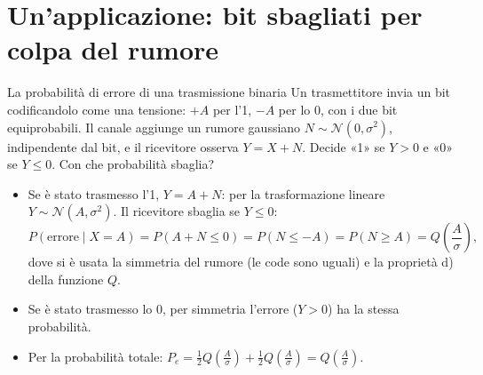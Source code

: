 \section{Un'applicazione: bit sbagliati per colpa del rumore}

\begin{esempio}{La probabilità di errore di una trasmissione binaria}
Un trasmettitore invia un bit codificandolo come una tensione: $+A$ per l'1, $-A$ per lo 0, con i due bit
equiprobabili. Il canale aggiunge un rumore gaussiano $N \sim \mathcal{N}(0, \sigma^2)$, indipendente dal bit, e il
ricevitore osserva $Y = X + N$. Decide «1» se $Y > 0$ e «0» se $Y \leq 0$. Con che probabilità sbaglia?
\begin{itemize}
  \item Se è stato trasmesso l'1, $Y = A + N$: per la trasformazione lineare $Y \sim \mathcal{N}(A, \sigma^2)$. Il
        ricevitore sbaglia se $Y \leq 0$:
        \[ P(\text{errore} \mid X = A) = P(A + N \leq 0) = P(N \leq -A) = P(N \geq A) = Q\left( \frac{A}{\sigma} \right) , \]
        dove si è usata la simmetria del rumore (le code sono uguali) e la proprietà d) della funzione $Q$.
  \item Se è stato trasmesso lo 0, per simmetria l'errore ($Y > 0$) ha la stessa probabilità.
  \item Per la probabilità totale: $P_e = \frac12 Q\left(\frac{A}{\sigma}\right) + \frac12 Q\left(\frac{A}{\sigma}\right) =
        Q\left(\frac{A}{\sigma}\right)$.
\end{itemize}
\begin{center}
\end{center}
\end{esempio}
